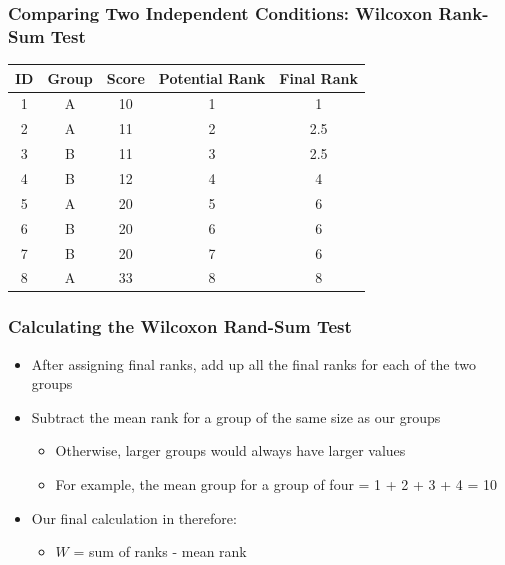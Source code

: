 \documentclass[12pt, block=fill]{beamer}
\begin{document}
\begin{frame}
  \frametitle{Comparing Two Independent Conditions: Wilcoxon Rank-Sum Test}

  \begin{center}
    \begin{tabular}{c|c|c|c|c}
      ID & Group & Score & Potential Rank & Final Rank \\ \hline
      1  & A     & 10    & 1              & 1   \\ \hline
      2  & A     & 11    & 2              & 2.5 \\ \hline
      3  & B     & 11    & 3              & 2.5 \\ \hline
      4  & B     & 12    & 4              & 4   \\ \hline
      5  & A     & 20    & 5              & 6   \\ \hline
      6  & B     & 20    & 6              & 6   \\ \hline
      7  & B     & 20    & 7              & 6   \\ \hline
      8  & A     & 33    & 8              & 8   \\
    \end{tabular}
  \end{center}

\end{frame}


\begin{frame}
  \frametitle{Calculating the Wilcoxon Rand-Sum Test}
  
  \begin{itemize}
    \item After assigning final ranks, add up all the final ranks for each of the two groups
    \item Subtract the mean rank for a group of the same size as our groups
    \begin{itemize}
      \item Otherwise, larger groups would always have larger values
      \item For example, the mean group for a group of four = 1 + 2 + 3 + 4 = 10
    \end{itemize}
    \item Our final calculation in therefore:
    \begin{itemize}
      \item $W$ = sum of ranks - mean rank
    \end{itemize}
  \end{itemize}
    
\end{frame}
\end{document}
